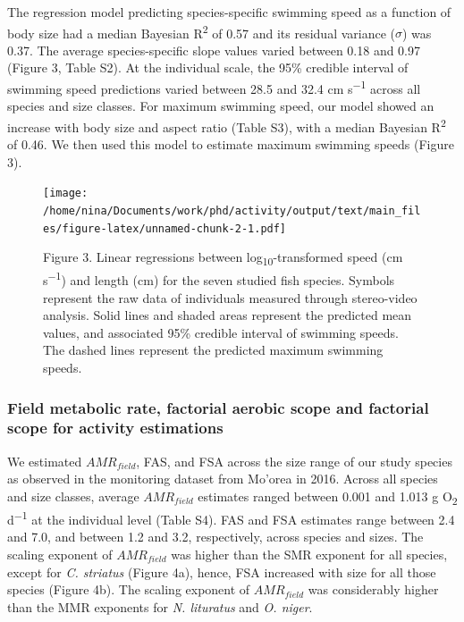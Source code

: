 \documentclass[
]{article}
\begin{document}
\noindent  The regression model predicting species-specific swimming
speed as a function of body size had a median Bayesian
R\textsuperscript{2} of 0.57 and its residual variance (\(\sigma\)) was
0.37. The average species-specific slope values varied between 0.18 and
0.97 (Figure 3, Table S2). At the individual scale, the 95\% credible
interval of swimming speed predictions varied between 28.5 and 32.4 cm
s\textsuperscript{−1} across all species and size classes. For maximum
swimming speed, our model showed an increase with body size and aspect
ratio (Table S3), with a median Bayesian R\textsuperscript{2} of 0.46.
We then used this model to estimate maximum swimming speeds (Figure 3).

\begin{figure}
\centering
\texttt{[image: /home/nina/Documents/work/phd/activity/output/text/main\_files/figure-latex/unnamed-chunk-2-1.pdf]}
\caption{Figure 3. Linear regressions between
log\textsubscript{10}-transformed speed (cm s\textsuperscript{−1}) and
length (cm) for the seven studied fish species. Symbols represent the
raw data of individuals measured through stereo-video analysis. Solid
lines and shaded areas represent the predicted mean values, and
associated 95\% credible interval of swimming speeds. The dashed lines
represent the predicted maximum swimming speeds.}
\end{figure}

\hypertarget{field-metabolic-rate-factorial-aerobic-scope-and-factorial-scope-for-activity-estimations}{%
\subsubsection{Field metabolic rate, factorial aerobic scope and
factorial scope for activity
estimations}\label{field-metabolic-rate-factorial-aerobic-scope-and-factorial-scope-for-activity-estimations}}

\noindent  We estimated \(AMR_{field}\), FAS, and FSA across the size
range of our study species as observed in the monitoring dataset from
Mo'orea in 2016. Across all species and size classes, average
\(AMR_{field}\) estimates ranged between 0.001 and 1.013 g
O\textsubscript{2} d\textsuperscript{−1} at the individual level (Table
S4). FAS and FSA estimates range between 2.4 and 7.0, and between 1.2
and 3.2, respectively, across species and sizes. The scaling exponent of
\(AMR_{field}\) was higher than the SMR exponent for all species, except
for \emph{C. striatus} (Figure 4a), hence, FSA increased with size for
all those species (Figure 4b). The scaling exponent of \(AMR_{field}\)
was considerably higher than the MMR exponents for \emph{N. lituratus}
and \emph{O. niger}. \newpage
\end{document}
